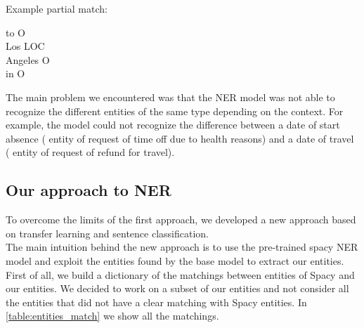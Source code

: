 Example partial match:
\begin{adjustwidth}{1cm}{}
    to O\\
    Los LOC\\
    Angeles O\\
    in O\\
\end{adjustwidth}
The main problem we encountered was that the NER model was not able to recognize the different entities of the same type depending on the context. For example, the model could not recognize the difference between a date of start absence ( entity of request of time off due to health reasons) and a date of travel ( entity of request of refund for travel).

\subsection{Our approach to NER}
\label{sec:ner_nc}
To overcome the limits of the first approach, we developed a new approach based on transfer learning and sentence classification. \\
The main intuition behind the new approach is to use the pre-trained spacy NER model and exploit the entities found by the base model to extract our entities. \\
First of all, we build a dictionary of the matchings between entities of Spacy and our entities. We decided to work on a subset of our entities and not consider all the entities that did not have a clear matching with Spacy entities. In \autoref{table:entities_match} we show all the matchings. 
\begin{table}[h]    
    \caption{Matching of our entities with Spacy entities}\label{table:entities_match}
\end{table}
